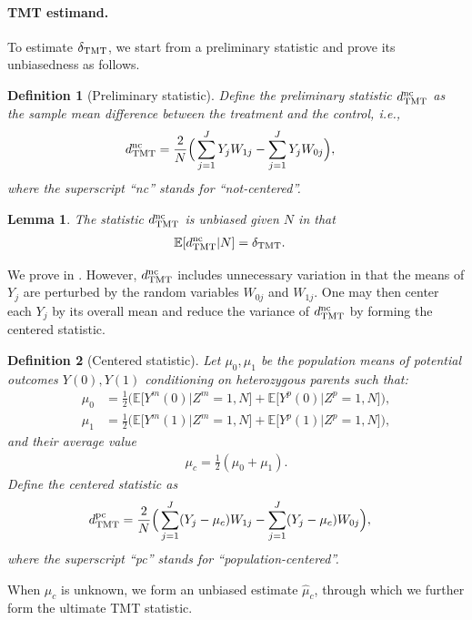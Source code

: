 \documentclass[12pt]{extarticle}
\newtheorem{lem}{Lemma}%
\newtheorem{defin}{Definition}%
\newcommand{\E}{\mathbb{E}}
\newcommand{\tmt}{{\normalfont \text{TMT}}}
\newcommand{\dtmtnc}{d_{\tmt}^{\normalfont \text{nc}}}
\newcommand{\dtmtpc}{d_{\tmt}^{\normalfont \text{pc}}}
\begin{document}
\paragraph{TMT estimand.} 

To estimate $\delta_{\tmt}$, we start from a preliminary statistic and prove its unbiasedness as follows.
\begin{defin}[Preliminary statistic]\label{def:dtmtnc} Define the preliminary statistic $\dtmtnc$ as the sample mean difference between the treatment and the control, i.e., 
\begin{align*}
\dtmtnc &= \frac{2}{N}\Big(\sum_{j=1}^J Y_jW_{1j} - \sum_{j=1}^JY_jW_{0j}\Big),
\end{align*}
where the superscript ``nc'' stands for ``not-centered''.
\end{defin} 

\begin{lem}\label{lem:dtmtnc_unbiased}
The statistic $\dtmtnc$ is unbiased given $N$ in that
\begin{align*}
\E [ \dtmtnc | N] &= \delta_{\tmt}.
\end{align*}
\end{lem} 

\noindent We prove  in . However, $\dtmtnc$ includes unnecessary variation in that the means of $Y_j$ are perturbed by the random variables $W_{0j}$ and $W_{1j}$. One may then center each $Y_j$ by its overall mean and reduce the variance of $\dtmtnc$ by forming the centered statistic.

\begin{defin}[Centered statistic]\label{def:dtmtpc}
Let $\mu_0,\mu_1$ be the population means of potential outcomes $Y(0),Y(1)$ conditioning on heterozygous parents such that: 
\begin{align*}
\mu_0 & = \frac{1}{2}\Big(\E\big[Y^m(0)\big|Z^m=1,N\big]+\E\big[Y^p(0)\big|Z^p=1,N\big]\Big), \nonumber \\
\mu_1 & = \frac{1}{2}\Big(\E\big[Y^m(1)\big|Z^m=1,N\big]+\E\big[Y^p(1)\big|Z^p=1,N\big]\Big), 
\end{align*} and their average value 
\begin{align*}
\mu_c = \frac{1}{2}(\mu_0 + \mu_1).
\end{align*}
Define the centered statistic as 
\begin{align*}
\dtmtpc &= \frac{2}{N}\Big(\sum_{j=1}^J (Y_j-\mu_c)W_{1j} - \sum_{j=1}^J(Y_j-\mu_c)W_{0j}\Big),
\end{align*} where the superscript ``pc'' stands for ``population-centered''.
\end{defin} 
\noindent When $\mu_c$ is unknown, we form an unbiased estimate $\hat{\mu}_c$, through which we further form the ultimate TMT statistic. 
\end{document}
